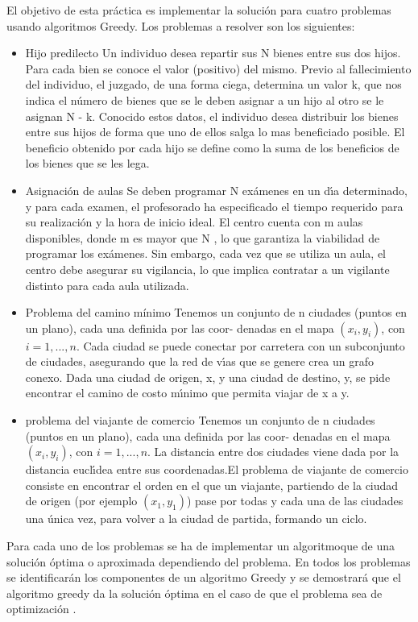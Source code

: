 \documentclass[11pt,openany]{book}
\begin{document}
El objetivo de esta práctica es implementar la solución para cuatro problemas 
usando algoritmos Greedy. Los problemas a resolver son los siguientes: 
\begin{itemize}

      \item Hijo predilecto 
            Un individuo desea repartir sus N bienes entre sus dos hijos. Para cada bien se conoce el
            valor (positivo) del mismo. Previo al fallecimiento del individuo, el juzgado, de una forma ciega,
            determina un valor k, que nos indica el número de bienes que se le deben asignar a un hijo al
            otro se le asignan N - k. Conocido estos datos, el individuo desea distribuir los bienes entre
            sus hijos de forma que uno de ellos salga lo mas beneficiado posible. El beneficio obtenido por
            cada hijo se define como la suma de los beneficios de los bienes que se les lega.
      \item Asignación de aulas
            Se deben programar N exámenes en un dı́a determinado, y para cada examen, el profesorado ha especificado el tiempo
            requerido para su realización y la hora de inicio ideal.
            El centro cuenta con m aulas disponibles, donde m es mayor que N , lo que garantiza la
            viabilidad de programar los exámenes. Sin embargo, cada vez que se utiliza un aula, el centro
            debe asegurar su vigilancia, lo que implica contratar a un vigilante distinto para cada aula
            utilizada.
      \item Problema del camino mínimo
            Tenemos un conjunto de n ciudades (puntos en un plano), cada una definida por las coor-
            denadas en el mapa $(x_i , y_i )$, con $i = 1, . . . , n$. Cada ciudad se puede conectar por carretera con
            un subconjunto de ciudades, asegurando que la red de vı́as que se genere crea un grafo conexo.
            Dada una ciudad de origen, x, y una ciudad de destino, y, se pide encontrar el camino de
            costo mı́nimo que permita viajar de x a y.
      \item problema del viajante de comercio
            Tenemos un conjunto de n ciudades (puntos en un plano), cada una definida por las coor-
            denadas en el mapa $(x_i , y_i )$, con $i = 1, . . . , n$. La distancia entre dos ciudades viene dada por la
            distancia euclı́dea entre sus coordenadas.El problema de viajante de comercio consiste en encontrar el orden en el que un viajante,
            partiendo de la ciudad de origen (por ejemplo $(x_1 , y_1 )$) pase por todas y cada una de las ciudades
            una única vez, para volver a la ciudad de partida, formando un ciclo.

\end{itemize}
Para cada uno de los problemas se ha de implementar
un algoritmoque de una solución óptima o aproximada dependiendo del problema. 
En todos los problemas se identificarán los componentes de un algoritmo Greedy y se demostrará que el algoritmo
greedy da la solución óptima en el caso de que el problema sea de optimización . 
\end{document}
